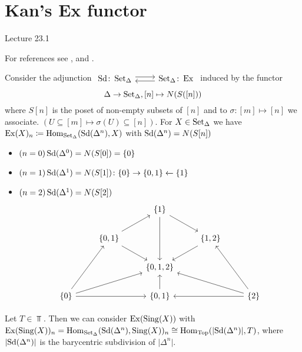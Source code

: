 \section{Kan's Ex functor}

Lecture 23.1

For references see \cite[Section 3.1]{Cisinski_2019}, \cite[Section III.4]{GoerSimp1999} and \cite[Section 3.3]{kerodon}.

Consider the adjunction 
$\begin{tikzcd}
    \Sd\colon \SetD
    \ar[r, shift left]
    &
    \SetD\colon\Ex
    \ar[l, shift left]
\end{tikzcd}$
induced by the functor 
\[
\Delta \to \operatorname{Set}_{\Delta}, [n] \mapsto N(S([n]))
\]
where $S[n]$ is the poset of non-empty subsets of $[n]$ and to $\sigma \colon [m] \mapsto [n]$ we associate.
$(U \subseteq [m] \mapsto \sigma(U) \subseteq [n])$.
For $X \in \operatorname{Set}_{\Delta}$ we have $\operatorname{Ex}(X)_n \coloneqq \operatorname{Hom}_{\operatorname{Set}_{\Delta}}(\operatorname{Sd}(\Delta^n),X)$ with $\operatorname{Sd}(\Delta^n)=N(S[n])$

\begin{exmp}
    \begin{itemize}
        \item 
        $(n=0) \operatorname{Sd}(\Delta^0) = N(S[0])=\{0\}$
        \item 
        $(n=1) \operatorname{Sd}(\Delta^1)=N(S[1]) \colon \{0\} \to \{ 0,1 \} \xleftarrow{}\{1\}$
        \item 
        $ (n=2) \operatorname{Sd}( \Delta^1) = N(S[2])$
        \[
        \begin{tikzcd}
            &&
            \{1\}
            \ar[rd]
            \ar[dd]
            \\
            &
            \{0,1\}
            \ar[rd]
            \ar[ru]
            &
            &
            \{1,2\}
            \ar[ld]
            \\
            &&
            \{0,1,2\}
            &&
            \\
            \{0\}
            \ar[ruu]
            \ar[rr]
            \ar[rru]
            &&
            \{0,1\}
            \ar[u]
            &&
            \{2\}
            \ar[ll]
            \ar[llu]
            \ar[luu]
        \end{tikzcd}
        \]
    \end{itemize}    
\end{exmp}

\begin{exmp}
    Let $T \in \Top$. Then we can consider $\operatorname{Ex}(\operatorname{Sing}(X))$ with $\operatorname{Ex}(\operatorname{Sing}(X))_n=\operatorname{Hom}_{\operatorname{Set}_{\Delta}}(\operatorname{Sd}(\Delta^n),\operatorname{Sing}(X))_n \cong \operatorname{Hom}_{\operatorname{Top}}(\lvert\operatorname{Sd}(\Delta^n)\rvert, T)$, where $\lvert\operatorname{Sd}(\Delta^n)\rvert$ is the barycentric subdivision of $\lvert\Delta^n\rvert$.
\end{exmp}    
    
